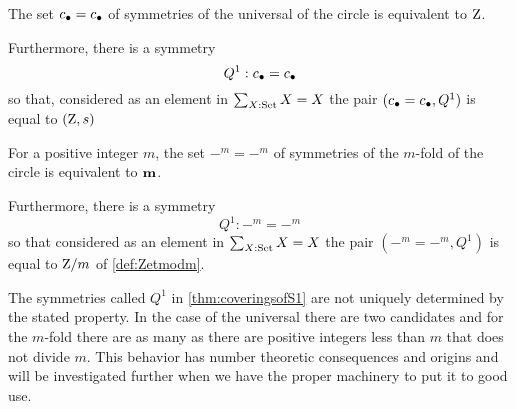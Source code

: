 \begin{theorem}
  \label{thm:coveringsofS1}
  The set $c_\bullet=c_\bullet$ of symmetries of the universal \covering of the circle is equivalent to $\mathrm{Z}$.  

Furthermore, there is a symmetry $$Q^1:c_\bullet=c_\bullet$$ so that, considered as an element in $\sum_{X:\mathord{\mathrm{Set}}}X=X$ the pair $(c_\bullet=c_\bullet,Q^1)$ is equal to $(\mathrm{Z},s)$
  
For a positive integer $m$, the set $-^m=-^m$ of symmetries of the $m$-fold \covering of the circle is equivalent to $\mathbf{m}$.  

Furthermore, there is a symmetry $$Q^1:-^m=-^m$$ so that considered as an element in $\sum_{X:\mathord{\mathrm{Set}}}X=X$ the pair $(-^m=-^m,Q^1)$ is equal to $\mathrm{Z}/m$ of \cref{def:Zetmodm}.
 \end{theorem}
\begin{remark}\label{rem:thenonuniquenessofgeneratorsofmodulararithmetic1}
  The symmetries called $Q^1$ in \cref{thm:coveringsofS1} are not uniquely determined by the stated property.  
In the case of the universal \covering there are two candidates and for the $m$-fold \covering there are as many as there are positive integers less than $m$ that does not divide $m$.  
This behavior has number theoretic consequences and origins and will be investigated further when we have the proper machinery to put it to good use.
\end{remark}


